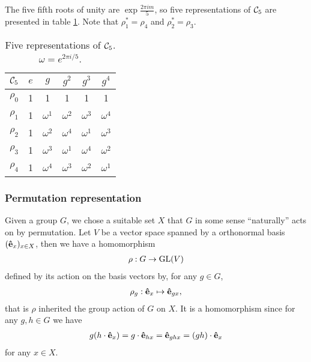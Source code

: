 \begin{example}
	The five fifth roots of unity are $\exp{\frac{2\pi im}{5}}$, so five representations of $\mathcal{C}_5$ are presented in table \ref{table:Cyc5}. Note that $\rho_1^* = \rho_4$ and $\rho_2^* = \rho_3$.
	
	\begin{table}[hbt!]
		\begin{tabular}{c | c c c c c}
			
			$\mathcal{C}_5$ & $e$ & $g$        & $g^2$      & $g^3$      & $g^4$      \\ \hline
			$\rho_0$            & 1   & 1          & 1          & 1          & 1          \\
			$\rho_1$            & 1   & $\omega^1$ & $\omega^2$ & $\omega^3$ & $\omega^4$ \\
			$\rho_2$            & 1   & $\omega^2$ & $\omega^4$ & $\omega^1$ & $\omega^3$ \\
			$\rho_3$            & 1   & $\omega^3$ & $\omega^1$ & $\omega^4$ & $\omega^2$ \\
			$\rho_4$            & 1   & $\omega^4$ & $\omega^3$ & $\omega^2$ & $\omega^1$
		\end{tabular}
		\centering
		\caption{Five representations of $\mathcal{C}_5$. $\omega = e^{2 \pi i/5}$.}
		\label{table:Cyc5}
	\end{table}
\end{example}



\subsubsection{Permutation representation}

	Given a group $G$, we chose a suitable set $X$ that $G$ in some sense ``naturally'' acts on by permutation. Let $V$ be a vector space spanned by a orthonormal basis $(\mathbf{\hat{e}}_x)_{x \in X}$, then we have a homomorphism
	\begin{align*}
		\rho:G \rightarrow \text{GL}(V)
	\end{align*} 
	defined by its action on the basis vectors by, for any $g \in G$, 
	\begin{align*}
		\rho_g: \mathbf{\hat{e}}_x \mapsto \mathbf{\hat{e}}_{gx},
	\end{align*}
	that is $\rho$ inherited the group action of $G$ on $X$. It is a homomorphism since for any $g,h \in G$ we have
	\begin{align*}
		g(h \cdot \mathbf{\hat{e}}_x) = g \cdot \mathbf{\hat{e}}_{hx}  = \mathbf{\hat{e}}_{ghx} = (gh) \cdot \mathbf{\hat{e}}_x
	\end{align*}
	for any $x \in X$.
	
